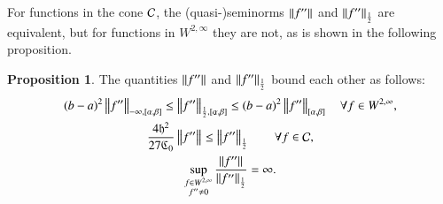 \documentclass[review]{elsarticle}
\theoremstyle{definition}
\renewcommand{\cw}{W}
\newtheorem{prop}[theorem]{Proposition}
\begin{document}
For functions in the cone $\cc$, the (quasi-)seminorms $\norm{f''}$ and $\norm[\frac
12]{f''}$ are equivalent, but  for functions in $ \cw^{2,\infty}$ they are not, as is shown in the following proposition.

\begin{prop} \label{equivnormprop} 
	The quantities $\norm{f''}$ and $\norm[\frac 12]{f''}$ bound each other as follows:
	\begin{subequations}
		\begin{gather}
		\label{halflessinf}
		(b-a)^2\norm[-\infty,{[\alpha,\beta]}]{f''}  \le \norm[\frac 12,{[\alpha,\beta]}]{f''}  
		\le (b-a)^2 \norm[{[\alpha,\beta]}]{f''} \quad \forall f \in \cw^{2,\infty}, \\
		\label{inflesshalf}
		\frac{4\fh^2}{27\fC_0} \norm{f''} \le \norm[\frac 12]{f''} \qquad \forall f \in \cc, \\
		\label{infhalfnoteq}
		\sup_{\substack{f \in \cw^{2,\infty}\\ f'' \ne 0}}  \frac{\norm{f''}}{\norm[\frac 12]{f''}} 
		= \infty.
		\end{gather}
	\end{subequations}
\end{prop}
\end{document}
